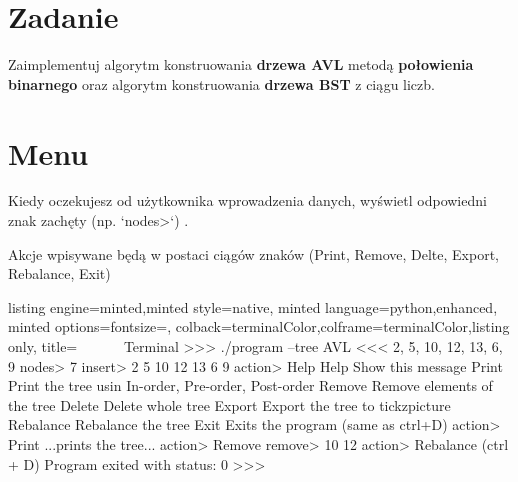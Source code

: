 \newpage

\section{Zadanie}
Zaimplementuj algorytm konstruowania \textbf{drzewa AVL} metodą \textbf{połowienia binarnego} oraz algorytm konstruowania \textbf{drzewa BST} z ciągu liczb. 


\begin{figure} [H]
    \noindent{}
\end{figure}

\section{Menu}
Kiedy oczekujesz od użytkownika wprowadzenia danych, wyświetl odpowiedni znak zachęty (np. `nodes>`) .





Akcje wpisywane będą w postaci ciągów znaków (Print, Remove, Delte, Export, Rebalance, Exit)

\begin{tcblisting}{listing engine=minted,minted style=native,
    minted language=python,enhanced,
    minted options={fontsize=\tiny},  
    colback=terminalColor,colframe=terminalColor,listing only, title= ~~~~~~Terminal}
>>>  ./program --tree AVL <<< 2, 5, 10, 12, 13, 6, 9
 nodes> 7
insert> 2 5 10 12 13 6 9
action> Help
Help        Show this message
Print       Print the tree usin In-order, Pre-order, Post-order
Remove      Remove elements of the tree 
Delete      Delete whole tree
Export      Export the tree to tickzpicture
Rebalance   Rebalance the tree
Exit        Exits the program (same as ctrl+D)
action> Print
...prints the tree...
action> Remove
remove> 10 12
action> Rebalance
(ctrl + D)
Program exited with status: 0
>>>
\end{tcblisting}

